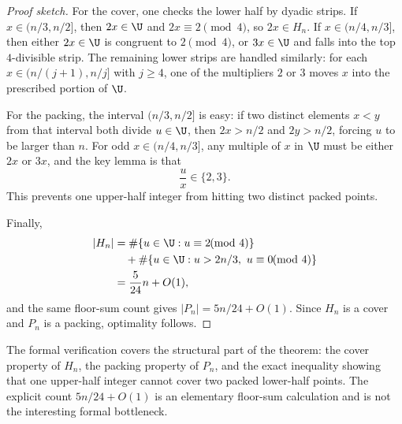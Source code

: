 \begin{proof}[Proof sketch]
For the cover, one checks the lower half by dyadic strips.  If
$x \in (n/3,n/2]$, then $2x \in \U$ and $2x \equiv 2 \pmod 4$, so $2x \in H_n$.
If $x \in (n/4,n/3]$, then either $2x \in \U$ is congruent to $2 \pmod 4$, or
$3x \in \U$ and falls into the top $4$-divisible strip.  The remaining lower
strips are handled similarly: for each $x \in (n/(j+1),n/j]$ with $j\ge 4$, one
of the multipliers $2$ or $3$ moves $x$ into the prescribed portion of $\U$.

For the packing, the interval $(n/3,n/2]$ is easy: if two distinct elements
$x<y$ from that interval both divide $u \in \U$, then $2x>n/2$ and $2y>n/2$,
forcing $u$ to be larger than $n$.  For odd $x \in (n/4,n/3]$, any multiple of
$x$ in $\U$ must be either $2x$ or $3x$, and the key lemma is that
\[
  \frac{u}{x} \in \{2,3\}.
\]
This prevents one upper-half integer from hitting two distinct packed points.

Finally,
\[
\begin{aligned}
  |H_n|
  &=
  \#\{u \in \U : u \equiv 2 \!\!\!\pmod 4\} \\
  &\quad +
  \#\{u \in \U : u > 2n/3,\ u \equiv 0 \!\!\!\pmod 4\} \\
  &=
  \frac{5}{24}n + O(1),
\end{aligned}
\]
and the same floor-sum count gives $|P_n| = 5n/24 + O(1)$.  Since $H_n$ is a
cover and $P_n$ is a packing, optimality follows.
\end{proof}

\begin{remark}
The formal verification covers the structural part of the theorem: the cover
property of $H_n$, the packing property of $P_n$, and the exact inequality
showing that one upper-half integer cannot cover two packed lower-half points.
The explicit count $5n/24+O(1)$ is an elementary floor-sum calculation and is
not the interesting formal bottleneck.
\end{remark}
